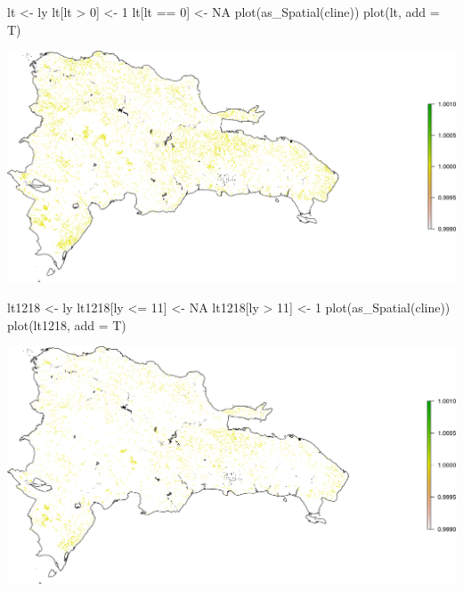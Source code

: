 \documentclass[10pt,landscape,a3paper]{article}
\newenvironment{Shaded}{\begin{snugshade}}{\end{snugshade}}
\newcommand{\AttributeTok}[1]{\textcolor[rgb]{0.77,0.63,0.00}{#1}}
\newcommand{\ConstantTok}[1]{\textcolor[rgb]{0.00,0.00,0.00}{#1}}
\newcommand{\DecValTok}[1]{\textcolor[rgb]{0.00,0.00,0.81}{#1}}
\newcommand{\FunctionTok}[1]{\textcolor[rgb]{0.00,0.00,0.00}{#1}}
\newcommand{\NormalTok}[1]{#1}
\newcommand{\OtherTok}[1]{\textcolor[rgb]{0.56,0.35,0.01}{#1}}
\newcommand{\SpecialCharTok}[1]{\textcolor[rgb]{0.00,0.00,0.00}{#1}}
\begin{document}
\begin{Shaded}
\begin{Highlighting}[]
\NormalTok{lt }\OtherTok{\textless{}{-}}\NormalTok{ ly}
\NormalTok{lt[lt }\SpecialCharTok{\textgreater{}} \DecValTok{0}\NormalTok{] }\OtherTok{\textless{}{-}} \DecValTok{1}
\NormalTok{lt[lt }\SpecialCharTok{==} \DecValTok{0}\NormalTok{] }\OtherTok{\textless{}{-}} \ConstantTok{NA}
\FunctionTok{plot}\NormalTok{(}\FunctionTok{as\_Spatial}\NormalTok{(cline))}
\FunctionTok{plot}\NormalTok{(lt, }\AttributeTok{add =}\NormalTok{ T)}
\end{Highlighting}
\end{Shaded}

\begin{center}\includegraphics{img/data-download-preparation-eda/year-of-gross-forest-cover-loss-nationwide-2} \end{center}

\begin{Shaded}
\begin{Highlighting}[]
\NormalTok{lt1218 }\OtherTok{\textless{}{-}}\NormalTok{ ly}
\NormalTok{lt1218[ly }\SpecialCharTok{\textless{}=} \DecValTok{11}\NormalTok{] }\OtherTok{\textless{}{-}} \ConstantTok{NA}
\NormalTok{lt1218[ly }\SpecialCharTok{\textgreater{}} \DecValTok{11}\NormalTok{] }\OtherTok{\textless{}{-}} \DecValTok{1}
\FunctionTok{plot}\NormalTok{(}\FunctionTok{as\_Spatial}\NormalTok{(cline))}
\FunctionTok{plot}\NormalTok{(lt1218, }\AttributeTok{add =}\NormalTok{ T)}
\end{Highlighting}
\end{Shaded}

\begin{center}\includegraphics{img/data-download-preparation-eda/year-of-gross-forest-cover-loss-nationwide-3} \end{center}
\end{document}
